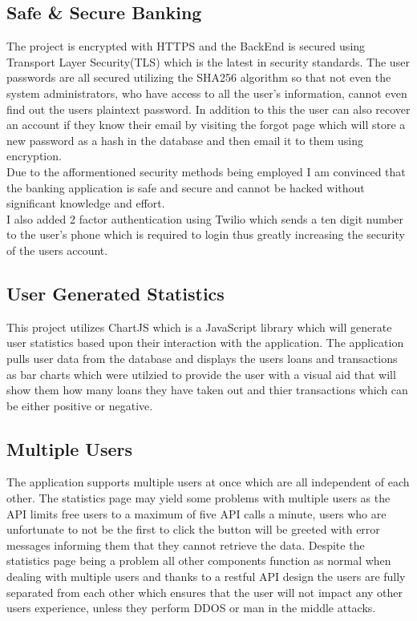 \subsection{Safe \& Secure Banking}
The project is encrypted with HTTPS and the BackEnd is secured using Transport
Layer Security(TLS) which is the latest in security standards.  The user passwords
are all secured utilizing the SHA256 algorithm so that not even the system administrators,
who have access to all the user's information, cannot even find out the users plaintext
password.  In addition to this the user can also recover an account if they know their email
by visiting the forgot page which will store a new password as a hash in the database and
then email it to them using encryption.
\\
Due to the afformentioned security methods being employed I am convinced that the
banking application is safe and secure and cannot be hacked without significant knowledge
and effort.
\\
I also added 2 factor authentication using Twilio which sends a ten digit number to the user's phone
which is required to login thus greatly increasing the security of the users account.
\subsection{User Generated Statistics}
This project utilizes ChartJS which is a JavaScript library which will generate
user statistics based upon their interaction with the application.  The application
pulls user data from the database and displays the users loans and transactions as
bar charts which were utilzied to provide the user with a visual aid that will show
them how many loans they have taken out and thier transactions which can be either
positive or negative.
\subsection{Multiple Users}
The application supports multiple users at once which are all independent of each
other.  The statistics page may yield some problems with multiple users as the
API limits free users to a maximum of five API calls a minute, users who are unfortunate
to not be the first to click the button will be greeted with error messages informing them
that they cannot retrieve the data.  Despite the statistics page being a problem all other
components function as normal when dealing with multiple users and thanks to a restful API
design the users are fully separated from each other which ensures that the user will not
impact any other users experience, unless they perform DDOS or man in the middle attacks.
